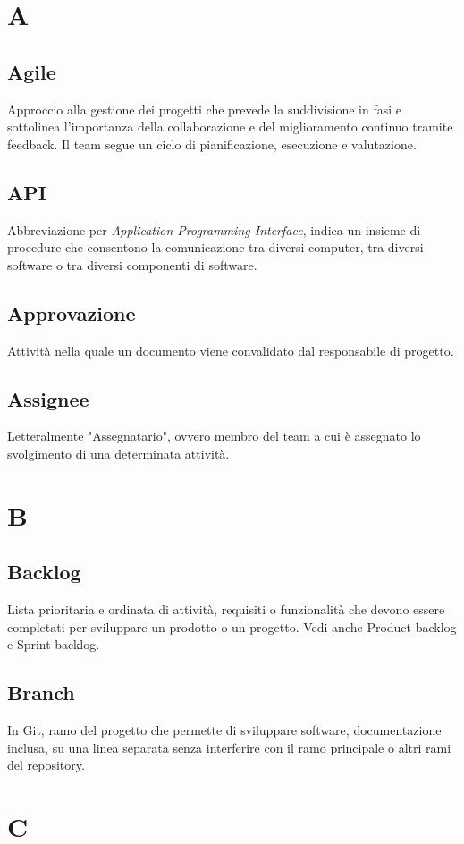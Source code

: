 \section{A}
    \subsection{Agile}
    Approccio alla gestione dei progetti che prevede la suddivisione in fasi e sottolinea 
    l'importanza della collaborazione e del miglioramento continuo tramite feedback. 
    Il team segue un ciclo di pianificazione, esecuzione e valutazione.
    \subsection{API}
    Abbreviazione per \textit{Application Programming Interface}, indica un insieme di 
    procedure che consentono la comunicazione tra diversi computer, tra diversi 
    software o tra diversi componenti di software.
    \subsection{Approvazione}
    Attività nella quale un documento viene convalidato dal responsabile di progetto.
    \subsection{Assignee}
    Letteralmente "Assegnatario", ovvero membro del team a cui è assegnato lo
    svolgimento di una determinata attività.
\section{B}
    \subsection{Backlog}
    Lista prioritaria e ordinata di attività, requisiti o funzionalità che devono 
    essere completati per sviluppare un prodotto o un progetto.
    Vedi anche Product backlog e Sprint backlog.
    \subsection{Branch}
    In Git, ramo del progetto che permette di sviluppare software, documentazione inclusa, su una linea separata 
    senza interferire con il ramo principale o altri rami del repository.

\section{C}
